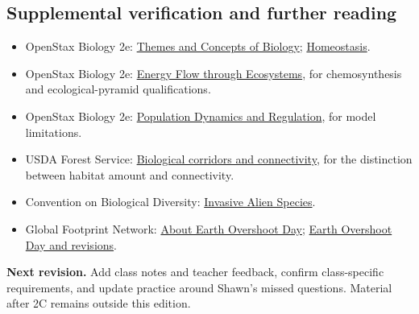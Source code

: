 \documentclass[11pt,letterpaper]{article}
\begin{document}
\subsection*{Supplemental verification and further reading}
\begin{itemize}
\item OpenStax Biology 2e: \href{https://openstax.org/books/biology-2e/pages/1-2-themes-and-concepts-of-biology}{Themes and Concepts of Biology}; \href{https://openstax.org/books/biology-2e/pages/33-3-homeostasis}{Homeostasis}.
\item OpenStax Biology 2e: \href{https://openstax.org/books/biology-2e/pages/46-2-energy-flow-through-ecosystems}{Energy Flow through Ecosystems}, for chemosynthesis and ecological-pyramid qualifications.
\item OpenStax Biology 2e: \href{https://openstax.org/books/biology-2e/pages/45-4-population-dynamics-and-regulation}{Population Dynamics and Regulation}, for model limitations.
\item USDA Forest Service: \href{https://research.fs.usda.gov/treesearch/52660}{Biological corridors and connectivity}, for the distinction between habitat amount and connectivity.
\item Convention on Biological Diversity: \href{https://www.cbd.int/invasive}{Invasive Alien Species}.
\item Global Footprint Network: \href{https://overshoot.footprintnetwork.org/about-earth-overshoot-day/}{About Earth Overshoot Day}; \href{https://footprintnetwork.org/our-work/earth-overshoot-day/}{Earth Overshoot Day and revisions}.
\end{itemize}
\textbf{Next revision.} Add class notes and teacher feedback, confirm class-specific requirements, and update practice around Shawn's missed questions. Material after 2C remains outside this edition.
\end{document}
